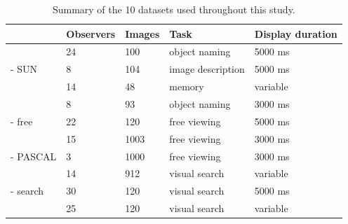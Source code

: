 \documentclass[a4paper, onecolumn, oneside, 11pt]{article}
\begin{document}
\begin{table}
\centering
\small
\begin{tabular}{l|llll}
 & Observers & Images &  Task & Display duration\\
\hline
\cite{clarke2013}     & 24    & 100   & object naming        & 5000 ms\\
\cite{yun2013} - SUN        & 8     & 104   & image description    & 5000 ms\\
\cite{tatler2005}     & 14    & 48     & memory & variable\\
\cite{einhauser2008} & 8    & 93      & object naming & 3000 ms \\
\hline
\cite{tatler2007} - free    & 22    & 120   & free viewing          & 5000 ms\\
\cite{judd2009}         & 15 & 1003      & free viewing & 3000 ms\\
\cite{yun2013} - PASCAL        & 3 & 1000  & free viewing & 3000 ms\\
\hline
\cite{ehinger2009}     & 14 & 912 &  visual search & variable\\
\cite{tatler2007} - search    & 30 & 120 &   visual search & 5000 ms\\
\cite{asher2013}    & 25    & 120      & visual search & variable\\
\end{tabular}

\caption{Summary of the 10 datasets used throughout this study.}
\label{tab:datasets}
\end{table}
\end{document}
